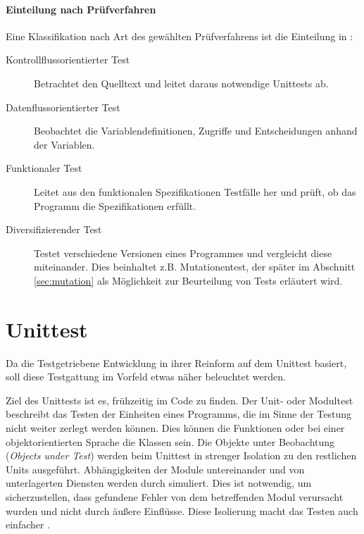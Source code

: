 \paragraph{Einteilung nach Prüfverfahren} Eine Klassifikation nach Art des gewählten Prüfverfahrens ist die Einteilung in \citep{liggesmeyer_modultest_1990}:
\begin{description}
 \item[Kontrollflussorientierter Test] Betrachtet den Quelltext und leitet daraus notwendige Unittests ab.
 \item[Datenflussorientierter Test] Beobachtet die Variablendefinitionen, Zugriffe und Entscheidungen anhand der Variablen.
 \item[Funktionaler Test] Leitet aus den funktionalen Spezifikationen Testfälle her und prüft, ob das Programm die Spezifikationen erfüllt.
 \item[Diversifizierender Test] Testet verschiedene Versionen eines Programmes und vergleicht diese miteinander. Dies beinhaltet z.B. Mutationentest, der später im Abschnitt \ref{sec:mutation} \textit{} als Möglichkeit zur Beurteilung von Tests erläutert wird.
\end{description}
\section{Unittest}
\label{sec:testUnit}
Da die Testgetriebene Entwicklung in ihrer Reinform auf dem Unittest basiert, soll diese Testgattung im Vorfeld etwas näher beleuchtet werden.

Ziel des Unittests ist es, frühzeitig  im Code zu finden. Der Unit- oder Modultest beschreibt das Testen der Einheiten eines Programms, die im Sinne der Testung nicht weiter zerlegt werden können. Dies können die Funktionen oder bei einer objektorientierten Sprache die Klassen sein. Die Objekte unter Beobachtung (\textit{Objects under Test}) werden beim Unittest in strenger Isolation zu den restlichen Units ausgeführt. Abhängigkeiten der Module untereinander und von unterlagerten Diensten werden durch  simuliert. Dies ist notwendig, um sicherzustellen, dass gefundene Fehler von dem betreffenden Modul verursacht wurden und nicht durch äußere Einflüsse. Diese Isolierung macht das Testen auch einfacher \citep{goodliffe_code_2006,liggesmeyer_modultest_1990}.



